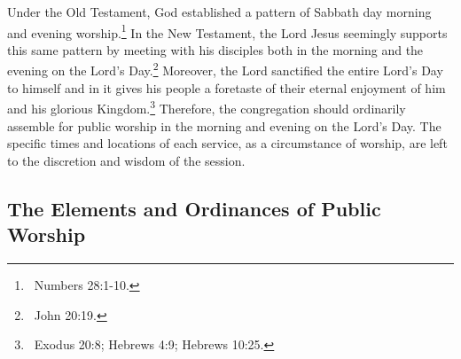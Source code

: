 \begin{outerlst}[left=0pt,labelsep=0pt]
\begin{innerlst}[wide, labelwidth=!, labelindent=0pt, labelsep=4pt]
    \item Under the Old Testament, God established a pattern of Sabbath day morning and evening worship.\footnote{\ Numbers 28:1-10.} In the New Testament, the Lord Jesus seemingly supports this same pattern by meeting with his disciples both in the morning and the evening on the Lord's Day.\footnote{\ John 20:19.} Moreover, the Lord sanctified the entire Lord's Day to himself and in it gives his people a foretaste of their eternal enjoyment of him and his glorious Kingdom.\footnote{\ Exodus 20:8; Hebrews 4:9; Hebrews 10:25.} Therefore, the congregation should ordinarily assemble for public worship in the morning and evening on the Lord's Day. The specific times and locations of each service, as a circumstance of worship, are left to the discretion and wisdom of the session.
\end{innerlst}

\subsection{The Elements and Ordinances of Public Worship} 


\end{outerlst}
